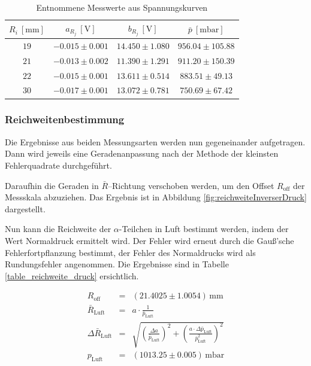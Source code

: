 \documentclass[12pt,a4paper]{scrartcl}
\numberwithin{equation}{section} %
\begin{document}
\begin{table}[H]
	\centering
	\begin{tabular}{||c|c|c|c||}
		\hline
		$R_i\ [\mathrm{mm}]$
			& $a_{R_j}\ [\mathrm{V}]$
			& $b_{R_j}\ [\mathrm{V}]$
			& $\bar{p}\ [\mathrm{mbar}]$ \\
		\hline \hline
		$19$
			& $-0.015 \pm 0.001$
			& $14.450 \pm 1.080$
			& $956.04 \pm 105.88$ \\
		\hline
		$21$
			& $-0.013 \pm 0.002$
			& $11.390 \pm 1.291$
			& $911.20 \pm 150.39$ \\
		\hline
		$22$
			& $-0.015 \pm 0.001$
			& $13.611 \pm 0.514$
			& $883.51 \pm 49.13$ \\
		\hline
		$30$
			& $-0.017 \pm 0.001$
			& $13.072 \pm 0.781$
			& $750.69 \pm 67.42$ \\
		\hline
	\end{tabular}
	\caption{Entnommene Messwerte aus Spannungskurven}
	\label{table_messwerte_spannung}
\end{table}

\hypertarget{Reichweite-Ergebnisse}{%
	\subsubsection{Reichweitenbestimmung}\label{Reichweite-Ergebnisse}}

Die Ergebnisse aus beiden Messungsarten werden nun gegeneinander aufgetragen. Dann wird jeweils eine Geradenanpassung nach der Methode der kleinsten Fehlerquadrate durchgeführt.

Daraufhin die Geraden in $\bar R$--Richtung verschoben werden, um den Offset $R_\mathrm{off}$ der Messskala abzuziehen. Das Ergebnis ist in Abbildung \ref{fig:reichweiteInverserDruck} dargestellt.

Nun kann die Reichweite der $\alpha$-Teilchen in Luft bestimmt werden, indem der Wert Normaldruck ermittelt wird. Der Fehler wird erneut durch die Gauß'sche Fehlerfortpflanzung bestimmt, der Fehler des Normaldrucks wird als Rundungsfehler angenommen. Die Ergebnisse sind in Tabelle \ref{table_reichweite_druck} ersichtlich.

\begin{eqnarray}
	R_\mathrm{off} &=& (21.4025 \pm 1.0054) \mathrm{\,mm} \\
	\bar{R}_\mathrm{Luft} &=& a \cdot \frac{1}{\bar{p}_\mathrm{Luft}} \\
	\Delta \bar{R}_\mathrm{Luft} &=& \sqrt{\left(\frac{\Delta a}{\bar{p}_\mathrm{Luft}}\right)^2 + \left(\frac{a \cdot \Delta \bar{p}_\mathrm{Luft}}{\bar{p}_\mathrm{Luft}^2}\right)^2} \label{eq:Reichweite Luft} \\
	p_\mathrm{Luft} &=&(1013.25 \pm 0.005) \mathrm{\, mbar}
\end{eqnarray}
\end{document}
